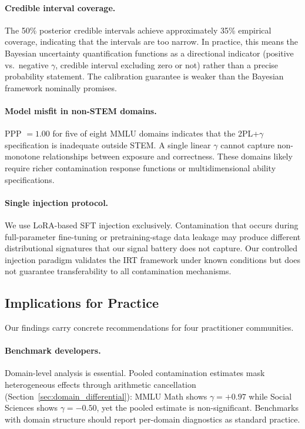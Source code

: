 \paragraph{Credible interval coverage.}
The 50\% posterior credible intervals achieve approximately 35\% empirical coverage, indicating that the intervals are too narrow. In practice, this means the Bayesian uncertainty quantification functions as a directional indicator (positive vs.\ negative $\gamma$, credible interval excluding zero or not) rather than a precise probability statement. The calibration guarantee is weaker than the Bayesian framework nominally promises.

\paragraph{Model misfit in non-STEM domains.}
PPP $= 1.00$ for five of eight MMLU domains indicates that the 2PL+$\gamma$ specification is inadequate outside STEM. A single linear $\gamma$ cannot capture non-monotone relationships between exposure and correctness. These domains likely require richer contamination response functions or multidimensional ability specifications.

\paragraph{Single injection protocol.}
We use LoRA-based SFT injection exclusively. Contamination that occurs during full-parameter fine-tuning or pretraining-stage data leakage may produce different distributional signatures that our signal battery does not capture. Our controlled injection paradigm validates the IRT framework under known conditions but does not guarantee transferability to all contamination mechanisms.

\subsection{Implications for Practice}
\label{sec:implications}

Our findings carry concrete recommendations for four practitioner communities.

\paragraph{Benchmark developers.}
Domain-level analysis is essential. Pooled contamination estimates mask heterogeneous effects through arithmetic cancellation (Section~\ref{sec:domain_differential}): MMLU Math shows $\gamma = +0.97$ while Social Sciences shows $\gamma = -0.50$, yet the pooled estimate is non-significant. Benchmarks with domain structure should report per-domain diagnostics as standard practice.

